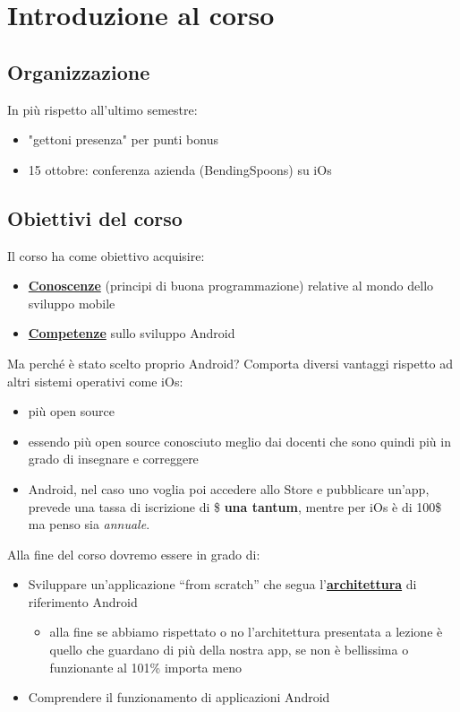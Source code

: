 
\chapter{Introduzione al corso}
\section{Organizzazione}
\par In più rispetto all'ultimo semestre:
\begin{itemize}
    \item "gettoni presenza" per punti bonus
    \item 15 ottobre: conferenza azienda (BendingSpoons) su iOs
\end{itemize}

\section{Obiettivi del corso}
\par Il corso ha come obiettivo acquisire:
\begin{itemize}
    \item \textbf{\underline{Conoscenze}} (principi di buona programmazione) relative al mondo dello sviluppo mobile
    \item \textbf{\underline{Competenze}} sullo sviluppo Android 
\end{itemize}
\par Ma perché è stato scelto proprio Android? Comporta diversi vantaggi rispetto ad altri sistemi operativi come iOs:
\begin{itemize}
    \item più open source
    \item essendo più open source conosciuto meglio dai docenti che sono quindi più in grado di insegnare e correggere
    \item Android, nel caso uno voglia poi accedere allo Store e pubblicare un'app, prevede una tassa di iscrizione di \$ \textbf{una tantum}, mentre per iOs è di 100\$ ma penso sia \textit{annuale}.
\end{itemize}
\par Alla fine del corso dovremo essere in grado di:
\begin{itemize}
    \item Sviluppare un'applicazione ``from scratch'' che segua l'\textbf{\underline{architettura}} di riferimento Android
    \begin{itemize}
        \item alla fine se abbiamo rispettato o no l'architettura presentata a lezione è quello che guardano di più della nostra app, se non è bellissima o funzionante al 101\% importa meno
    \end{itemize}
    \item Comprendere il funzionamento di applicazioni Android
\end{itemize} 

